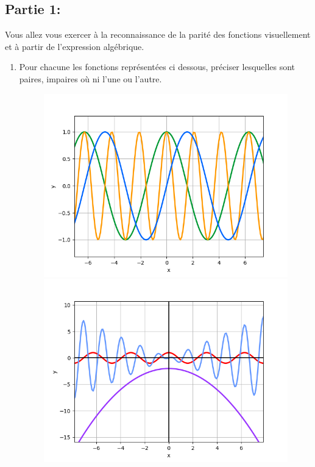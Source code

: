 \documentclass[11pt, french]{article}
\begin{document}
\subsection*{Partie 1:}
Vous allez vous exercer à la reconnaissance de la parité des fonctions visuellement et à partir de l'expression algébrique.

\begin{enumerate}
    \item Pour chacune les fonctions représentées ci dessous, préciser lesquelles sont paires, impaires où ni l'une ou l'autre.
    \begin{figure}[!h]
        \center
        \includegraphics[scale=0.32]{assets/serie_2_exo_2_figure_2.png}
        \includegraphics[scale=0.32]{assets/serie_2_exo_2_figure_3.png}

\end{figure}
\end{enumerate}
\end{document}
